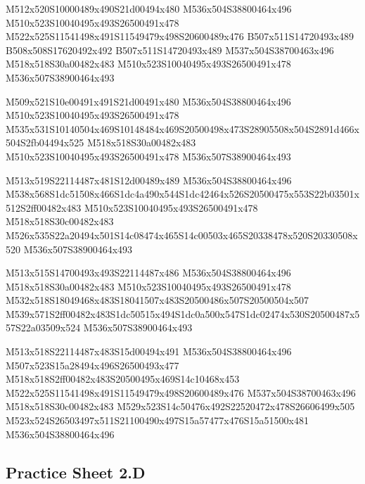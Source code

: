 \documentclass{article}
\begin{document}
\begin{multicols}{5}
\begin{center}
M512x520S10000489x490S21d00494x480 %
M536x504S38800464x496 %
M510x523S10040495x493S26500491x478 %
M522x525S11541498x491S11549479x498S20600489x476 %
B507x511S14720493x489 %
B508x508S17620492x492 %
B507x511S14720493x489 %
M537x504S38700463x496 %
M518x518S30a00482x483 %
M510x523S10040495x493S26500491x478 %
M536x507S38900464x493 %
\vfil
\columnbreak

M509x521S10e00491x491S21d00491x480 %
M536x504S38800464x496 %
M510x523S10040495x493S26500491x478 %
M535x531S10140504x469S10148484x469S20500498x473S28905508x504S2891d466x504S2fb04494x525 %
M518x518S30a00482x483 %
M510x523S10040495x493S26500491x478 %
M536x507S38900464x493 %
\vfil
\columnbreak

M513x519S22114487x481S12d00489x489 %
M536x504S38800464x496 %
M538x568S1dc51508x466S1dc4a490x544S1dc42464x526S20500475x553S22b03501x512S2ff00482x483 %
M510x523S10040495x493S26500491x478 %
M518x518S30c00482x483 %
M526x535S22a20494x501S14c08474x465S14c00503x465S20338478x520S20330508x520 %
M536x507S38900464x493 %
\vfil
\columnbreak

M513x515S14700493x493S22114487x486 %
M536x504S38800464x496 %
M518x518S30a00482x483 %
M510x523S10040495x493S26500491x478 %
M532x518S18049468x483S18041507x483S20500486x507S20500504x507 %
M539x571S2ff00482x483S1dc50515x494S1dc0a500x547S1dc02474x530S20500487x557S22a03509x524 %
M536x507S38900464x493 %
\vfil
\columnbreak

M513x518S22114487x483S15d00494x491 %
M536x504S38800464x496 %
M507x523S15a28494x496S26500493x477 %
M518x518S2ff00482x483S20500495x469S14c10468x453 %
M522x525S11541498x491S11549479x498S20600489x476 %
M537x504S38700463x496 %
M518x518S30c00482x483 %
M529x523S14c50476x492S22520472x478S26606499x505 %
M523x524S26503497x511S21100490x497S15a57477x476S15a51500x481
M536x504S38800464x496 %
\vfil

\end{center}
\end{multicols}

\subsection{Practice Sheet 2.D}
\end{document}
